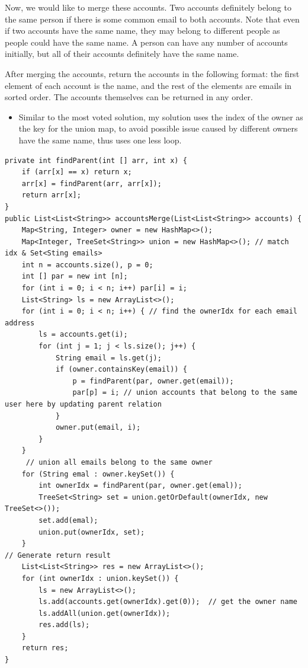 \documentclass[9pt, b5paaper]{book}
\begin{document}
Now, we would like to merge these accounts. Two accounts definitely belong to the same person if there is some common email to both accounts. Note that even if two accounts have the same name, they may belong to different people as people could have the same name. A person can have any number of accounts initially, but all of their accounts definitely have the same name.

After merging the accounts, return the accounts in the following format: the first element of each account is the name, and the rest of the elements are emails in sorted order. The accounts themselves can be returned in any order.

\begin{itemize}
\item Similar to the most voted solution, my solution uses the index of the owner as the key for the union map, to avoid possible issue caused by different owners have the same name, thus uses one less loop.
\end{itemize}

\begin{verbatim}
private int findParent(int [] arr, int x) {
    if (arr[x] == x) return x;
    arr[x] = findParent(arr, arr[x]);
    return arr[x];
}
public List<List<String>> accountsMerge(List<List<String>> accounts) {
    Map<String, Integer> owner = new HashMap<>();
    Map<Integer, TreeSet<String>> union = new HashMap<>(); // match idx & Set<Sting emails>
    int n = accounts.size(), p = 0;
    int [] par = new int [n];
    for (int i = 0; i < n; i++) par[i] = i;
    List<String> ls = new ArrayList<>(); 
    for (int i = 0; i < n; i++) { // find the ownerIdx for each email address
        ls = accounts.get(i);
        for (int j = 1; j < ls.size(); j++) {
            String email = ls.get(j);
            if (owner.containsKey(email)) {
                p = findParent(par, owner.get(email));
                par[p] = i; // union accounts that belong to the same user here by updating parent relation
            }
            owner.put(email, i);
        }
    }
     // union all emails belong to the same owner
    for (String emal : owner.keySet()) {
        int ownerIdx = findParent(par, owner.get(emal));
        TreeSet<String> set = union.getOrDefault(ownerIdx, new TreeSet<>());
        set.add(emal);
        union.put(ownerIdx, set);
    }
// Generate return result
    List<List<String>> res = new ArrayList<>();
    for (int ownerIdx : union.keySet()) {
        ls = new ArrayList<>();
        ls.add(accounts.get(ownerIdx).get(0));  // get the owner name
        ls.addAll(union.get(ownerIdx));
        res.add(ls);
    }
    return res;
}
\end{verbatim}
\end{document}
